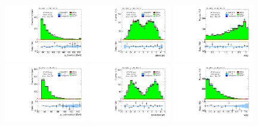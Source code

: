 \clearpage

\begin{figure}[tp]
  \centering
  \includegraphics[width=0.32\textwidth]{figures/analysis/vbf-SSXCR/jet-1-pt}
  \includegraphics[width=0.32\textwidth]{figures/analysis/vbf-SSXCR/jet-1-eta}
  \includegraphics[width=0.32\textwidth]{figures/analysis/vbf-SSXCR/jets-dphi} \\
  \includegraphics[width=0.32\textwidth]{figures/analysis/vbf-SSXCR/jet-2-pt}
  \includegraphics[width=0.32\textwidth]{figures/analysis/vbf-SSXCR/jet-2-eta}
  \includegraphics[width=0.32\textwidth]{figures/analysis/vbf-SSXCR/jets-deta} \\

\end{figure}

